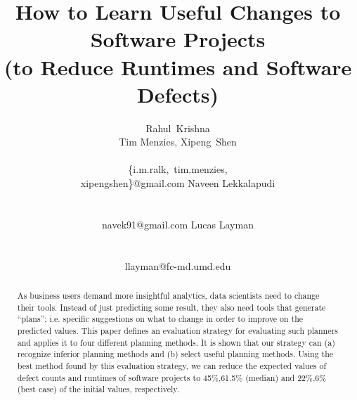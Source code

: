 \documentclass{sig-alternate}
\begin{document}
  


\title{How to Learn Useful Changes to Software Projects\\(to Reduce Runtimes and Software Defects)}
\author{
\alignauthor 
Rahul~Krishna\\Tim Menzies, Xipeng~Shen \\
       \\
       {\{i.m.ralk,~tim.menzies,\\xipengshen\}@gmail.com}
\alignauthor
Naveen   Lekkalapudi\\
  \\ 
       \\ 
       {navek91@gmail.com}
\alignauthor
Lucas Layman \\
        \\ 
       \\ 
       {llayman@fc-md.umd.edu}
\setlength{\columnsep}{7mm}
}
\maketitle
\begin{abstract}
 As business users demand more insightful
 analytics, data scientists need to change
 their tools. Instead of just predicting 
 some result, they also need tools that generate ``plans'';
 i.e. specific suggestions on  what to change  in order to
 improve on the predicted values.
This paper defines an evaluation strategy for evaluating such  planners and applies it to four different planning methods.
It is shown that our  strategy  can (a) recognize   inferior planning methods and  (b) select useful planning methods.
Using the best method found by this evaluation strategy,  we can
reduce
 the expected values of defect counts and  runtimes of software projects to    
 45\%,61.5\%  (median) and 22\%,6\% (best case) of the initial values, respectively.
\end{abstract}
\end{document}

